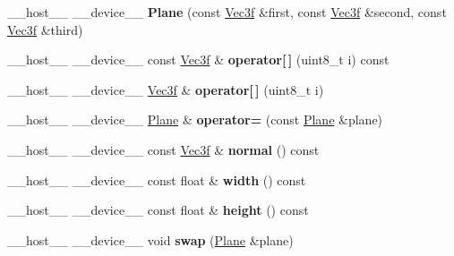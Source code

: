 \begin{DoxyCompactItemize}
\item 
\+\_\+\+\_\+host\+\_\+\+\_\+ \+\_\+\+\_\+device\+\_\+\+\_\+ {\bfseries Plane} (const \hyperlink{class_vec3}{Vec3f} \&first, const \hyperlink{class_vec3}{Vec3f} \&second, const \hyperlink{class_vec3}{Vec3f} \&third)\hypertarget{class_plane_ab97bc9588363dbf0ed870ded0817d9b6}{}\label{class_plane_ab97bc9588363dbf0ed870ded0817d9b6}

\item 
\+\_\+\+\_\+host\+\_\+\+\_\+ \+\_\+\+\_\+device\+\_\+\+\_\+ const \hyperlink{class_vec3}{Vec3f} \& {\bfseries operator\mbox{[}$\,$\mbox{]}} (uint8\+\_\+t i) const\hypertarget{class_plane_acac8cd6f2c9007cca2d2b1a784ec8724}{}\label{class_plane_acac8cd6f2c9007cca2d2b1a784ec8724}

\item 
\+\_\+\+\_\+host\+\_\+\+\_\+ \+\_\+\+\_\+device\+\_\+\+\_\+ \hyperlink{class_vec3}{Vec3f} \& {\bfseries operator\mbox{[}$\,$\mbox{]}} (uint8\+\_\+t i)\hypertarget{class_plane_a1c26eef083656152b03211035cfee262}{}\label{class_plane_a1c26eef083656152b03211035cfee262}

\item 
\+\_\+\+\_\+host\+\_\+\+\_\+ \+\_\+\+\_\+device\+\_\+\+\_\+ \hyperlink{class_plane}{Plane} \& {\bfseries operator=} (const \hyperlink{class_plane}{Plane} \&plane)\hypertarget{class_plane_ab48bade0506ac7436016f6e58b7eb314}{}\label{class_plane_ab48bade0506ac7436016f6e58b7eb314}

\item 
\+\_\+\+\_\+host\+\_\+\+\_\+ \+\_\+\+\_\+device\+\_\+\+\_\+ const \hyperlink{class_vec3}{Vec3f} \& {\bfseries normal} () const\hypertarget{class_plane_ae07efcb5f3e839b0c4ef183053fe1553}{}\label{class_plane_ae07efcb5f3e839b0c4ef183053fe1553}

\item 
\+\_\+\+\_\+host\+\_\+\+\_\+ \+\_\+\+\_\+device\+\_\+\+\_\+ const float \& {\bfseries width} () const\hypertarget{class_plane_a86585b7998f5a76486b75bdbd864f552}{}\label{class_plane_a86585b7998f5a76486b75bdbd864f552}

\item 
\+\_\+\+\_\+host\+\_\+\+\_\+ \+\_\+\+\_\+device\+\_\+\+\_\+ const float \& {\bfseries height} () const\hypertarget{class_plane_ad51996ac4e28e9113ca4581820127aba}{}\label{class_plane_ad51996ac4e28e9113ca4581820127aba}

\item 
\+\_\+\+\_\+host\+\_\+\+\_\+ \+\_\+\+\_\+device\+\_\+\+\_\+ void {\bfseries swap} (\hyperlink{class_plane}{Plane} \&plane)\hypertarget{class_plane_abd61cd7527ed084a867050bee3f4c4ec}{}\label{class_plane_abd61cd7527ed084a867050bee3f4c4ec}


\end{DoxyCompactItemize}
